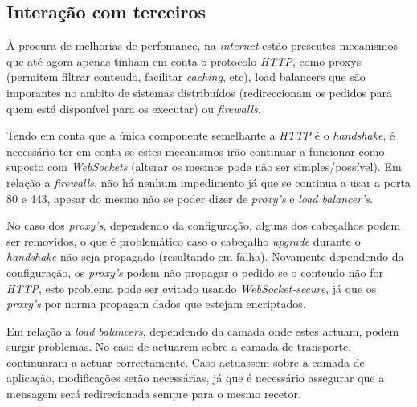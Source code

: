 \documentclass[a4paper]{article}
\begin{document}
\subsection{Interação com terceiros} 

À procura de melhorias de perfomance, na \emph{internet} estão presentes mecanismos que até agora apenas tinham em conta o protocolo \emph{HTTP}, como proxys (permitem filtrar conteudo, facilitar \emph{caching}, etc), load balancers que são imporantes no ambito de sistemas distribuídos (redireccionam os pedidos para quem está disponível para os executar) ou \emph{firewalls}.

Tendo em conta que a única componente semelhante a \emph{HTTP} é o \emph{handshake}, é necessário ter em conta se estes mecanismos irão continuar a funcionar como suposto com \emph{WebSockets} (alterar os mesmos pode não ser simples/possível). Em relação a \emph{firewalls}, não há nenhum impedimento já que se continua a usar a porta 80 e 443, apesar do mesmo não se poder dizer de \emph{proxy's} e \emph{load balancer's}.

No caso dos \emph{proxy's}, dependendo da configuração, alguns dos cabeçalhos podem ser removidos, o que é problemático caso o cabeçalho \emph{upgrade} durante o \emph{handshake} não seja propagado (resultando em falha). Novamente dependendo da configuração, os \emph{proxy's} podem não propagar o pedido se o conteudo não for \emph{HTTP}, este problema pode ser evitado usando \emph{WebSocket-secure}, já que os \emph{proxy's} por norma propagam dados que estejam encriptados. 

Em relação a \emph{load balancers}, dependendo da camada onde estes actuam, podem surgir problemas. No caso de actuarem sobre a camada de transporte, continuaram a actuar correctamente. Caso actuassem sobre a camada de aplicação, modificações serão necessárias, já que é necessário assegurar que a mensagem será redirecionada sempre para o mesmo recetor.
\end{document}
